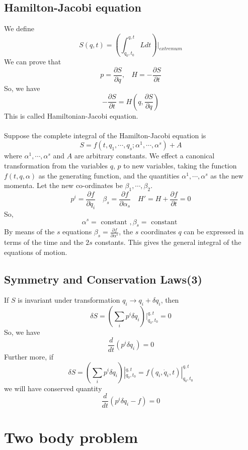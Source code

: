 \documentclass[cyan]{elegantnote}
\begin{document}
\section{Hamilton-Jacobi equation}
We define
\[S(q,t)=\left(\int_{q_0,t_0}^{q,t} L dt\right)|_{extremum}\]
We can prove that
\[p = \frac{\partial S}{\partial q}, \ \ \ \ H = -\frac{\partial S}{\partial t}\]
So, we have
\[-\frac{\partial S}{\partial t} = H (q,\frac{\partial S}{\partial q})\]
This is called Hamiltonian-Jacobi equation.\\ \\
Suppose the complete integral of the Hamilton-Jacobi equation is
\[S=f(t,q_1,\cdots,q_s;\alpha^1,\cdots,\alpha^s)+A\]
where $\alpha^1,\cdots,\alpha^s$ and $A$ are arbitrary constants. We effect a canonical transformation from the
variables $q$, $p$ to new variables, taking the function $f(t,q,\alpha)$ as the generating function, and the quantities $\alpha^1,\cdots,\alpha^s$ as the new momenta.
Let the new co-ordinates be $\beta_1,\cdots,\beta_2$.
\[p^i = \frac{\partial f}{\partial q_i} \quad \beta_s = \frac{\partial f}{\partial \alpha_s} \quad H' = H + \frac{\partial f}{\partial t} =0\]
So,
\[\alpha^s = \mbox{ constant }, \beta_s = \mbox{ constant }\]
By means of the $s$ equations $\beta_s = \frac{\partial f}{\partial \alpha^s}$, the $s$ coordinates $q$ can be expressed in terms of the time and the $2s$ constants. This gives the general integral of the equations of motion.

\section{Symmetry and Conservation Laws(3)}
If $S$ is invariant under transformation
$q_i \rightarrow q_i + \delta q_i$, then 
\[\delta S = (\sum_i p^i \delta q_i) |_{q_0,t_0}^{q,t} = 0\]
So, we have
\[\frac{d}{dt} (p^i \delta q_i) = 0\]
Further more, if
\[\delta S = (\sum_i p^i \delta q_i) |_{q_0,t_0}^{q,t} =  f(q_i,\dot{q}_i,t)|_{q_0,t_0}^{q,t}\]
we will have conserved quantity
\[\frac{d}{dt} (p^i \delta q_i -f) = 0\]

\chapter{Two body problem}
\end{document}
